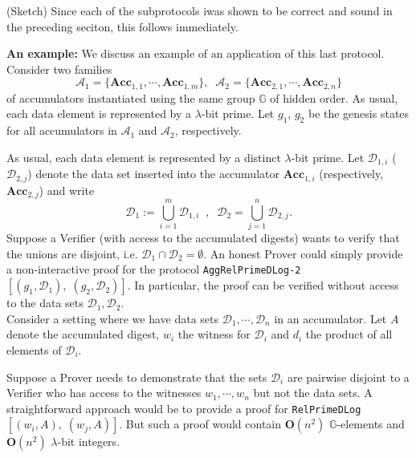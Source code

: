 \documentclass[11pt, lettersize, notitlepage, leqno, footskip=0.6cm]{article}
\newcommand{\Acc}{\mbf{Acc}}
\newcommand{\mc}{\mathcal}
\newcommand{\mb}{\mathbb}
\newcommand{\mbf}{\mathbf}
\newcommand{\lam}{\lambda}
\newcommand{\lamb}{\lambda}
\numberwithin{equation}{section}
\begin{document}
\begin{prf} (Sketch) Since each of the subprotocols iwas shown to be correct and sound in the preceding seciton, this follows immediately.\end{prf}

\noindent \textbf{An example:} We discuss an example of an application of this last protocol. Consider two families \vspace{-0.1cm}$$\mc{A}_1 = \{\Acc_{1,1},\cdots,\Acc_{1, m}\}, \;\; \mc{A}_2 = \{\Acc_{2,1},\cdots,\Acc_{2, n}\} $$ of accumulators instantiated using the same group $\mb{G}$ of hidden order. As usual, each data element is represented by a $\lam$-bit prime. Let $g_1$, $g_2$ be the genesis states for all accumulators in $\mc{A}_1$ and $\mc{A}_2$, respectively. 

As usual, each data element is represented by a distinct $\lamb$-bit prime. Let $\mc{D}_{1, i}$ ($\mc{D}_{2, j}$) denote the data set inserted into the accumulator $\Acc_{1, i}$ (respectively, $\Acc_{2, j}$) and write $$\mc{D}_1 := \bigcup\limits_{i=1}^m  \mc{D}_{1,i}\;\; ,\;\;\mc{D}_2 = \bigcup\limits_{j=1}^n  \mc{D}_{2,j}.$$ Suppose a Verifier (with access to the accumulated digests) wants to verify that the unions are disjoint, i.e. $\mc{D}_1 \cap \mc{D}_2 = \emptyset.$ An honest Prover could simply provide a non-interactive proof for the protocol \verb|AggRelPrimeDLog-2|$[(g_1, \mc{D}_1) ,\;(g_2, \mc{D}_2)]$. In particular, the proof can be verified without access to the data sets $\mc{D}_{1}, \mc{D}_{2}$. \\


Consider a setting where we have data sets $\mc{D}_1,\cdots, \mc{D}_n$ in an accumulator. Let $A$ denote the accumulated digest, $w_i$ the witness for $\mc{D}_i$ and $d_i$ the product of all elements of $\mc{D}_i$. 

Suppose a Prover needs to demonstrate that the sets $\mc{D}_i$ are pairwise disjoint to a Verifier who has access to the witnesses $w_1,\cdots,w_n$ but not the data sets. A straightforward approach would be to provide a proof for \verb|RelPrimeDLog|$[(w_i, A),\;(w_j, A)]$. But such a proof would contain $\mbf{O}(n^2)$ $\mb{G}$-elements and $\mbf{O}(n^2)$ $\lam$-bit integers. 
\end{document}
